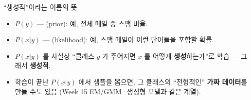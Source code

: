 \begin{frame}{``생성적''이라는 이름의 뜻}
  \begin{itemize}
    \item $P(y)$ --- (prior): 예, 전체 메일 중 스팸 비율.
    \item $P(x|y)$ --- (likelihood): 예, 스팸 메일이 이런
      단어들을 포함할 확률.
    \item $P(x|y)$ 를 사실상 ``클래스 $y$ 가 주어지면 $x$ 를 어떻게
      \textbf{생성}하는가''로 학습 --- 그래서 \textbf{생성적}.
    \item 학습이 끝난 $P(x|y)$ 에서 샘플을 뽑으면, 그 클래스의
      ``전형적인'' \textbf{가짜 데이터}를 만들 수도 있음 (Week 15
      EM/GMM·생성형 모델과 같은 계열).
  \end{itemize}
\end{frame}

